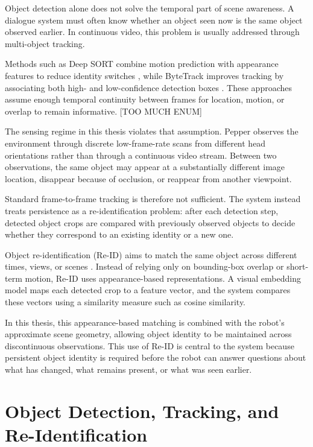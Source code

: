 Object detection alone does not solve the temporal part of scene awareness. A dialogue system must often know whether an object seen now is the same object observed earlier. In continuous video, this problem is usually addressed through multi-object tracking.

Methods such as Deep SORT combine motion prediction with appearance features to reduce identity switches \cite{wojke_simple_2017}, while ByteTrack improves tracking by associating both high- and low-confidence detection boxes \cite{zhang_bytetrack_2022}. These approaches assume enough temporal continuity between frames for location, motion, or overlap to remain informative. [TOO MUCH ENUM]

The sensing regime in this thesis violates that assumption. Pepper observes the environment through discrete low-frame-rate scans from different head orientations rather than through a continuous video stream. Between two observations, the same object may appear at a substantially different image location, disappear because of occlusion, or reappear from another viewpoint.

Standard frame-to-frame tracking is therefore not sufficient. The system instead treats persistence as a re-identification problem: after each detection step, detected object crops are compared with previously observed objects to decide whether they correspond to an existing identity or a new one.

Object re-identification (Re-ID) aims to match the same object across different times, views, or scenes \cite{ye_transformer_2024}. Instead of relying only on bounding-box overlap or short-term motion, Re-ID uses appearance-based representations. A visual embedding model maps each detected crop to a feature vector, and the system compares these vectors using a similarity measure such as cosine similarity.

In this thesis, this appearance-based matching is combined with the robot's approximate scene geometry, allowing object identity to be maintained across discontinuous observations. This use of Re-ID is central to the system because persistent object identity is required before the robot can answer questions about what has changed, what remains present, or what was seen earlier.


\section{Object Detection, Tracking, and Re-Identification}

